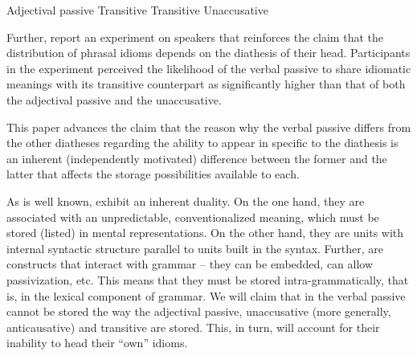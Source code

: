 \documentclass[output=paper]{langsci/langscibook}
\begin{document}
\ea\label{ex:key:20.2} 
    \ea Adjectival passive
    \ex Transitive
    \z
\z
\newpage
\ea\label{ex:key:20.3} 
    \ea Transitive
    \ex Unaccusative
    \z
\z

Further, \textcite{SilHorKluWex2018} report an experiment on 
speakers that reinforces the claim that the distribution of phrasal idioms
depends on the diathesis of their head. Participants in the experiment
perceived the likelihood of the verbal passive to share idiomatic meanings with
its transitive counterpart as significantly higher than that of both the
adjectival passive and the unaccusative.

This paper advances the claim that the reason why the verbal passive differs
from the other diatheses regarding the ability to appear in  specific to
the diathesis is an inherent (independently motivated) difference between the
former and the latter that affects the storage possibilities available to each.

As is well known,  exhibit an inherent duality. On the one hand, they are
associated with an unpredictable, conventionalized meaning, which must be
stored (listed) in mental representations. On the other hand, they are units
with internal syntactic structure parallel to units built in the syntax.
Further,  are constructs that interact with grammar – they can be
embedded, can allow passivization, etc. This means that they must be stored
intra-grammatically, that is, in the lexical component of grammar. We will
claim that  in the verbal passive cannot be stored the way the adjectival
passive, unaccusative (more generally, anticausative) and transitive  are
stored. This, in turn, will account for their inability to head their \enquote{own}
idioms.
\end{document}
